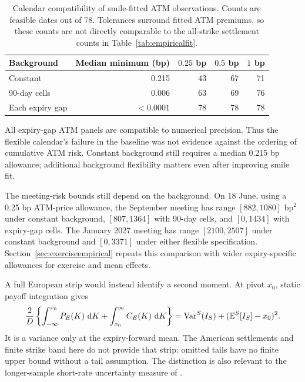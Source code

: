 \begin{table}[ht]
\centering\small
\begin{tabular}{lrrrr}
\toprule
Background & Median minimum (bp)& $0.25$ bp & $0.5$ bp & $1$ bp\\
\midrule
Constant &0.215&43&67&71\\
90-day cells &0.006&63&69&76\\
Each expiry gap &$<0.0001$&78&78&78\\
\bottomrule
\end{tabular}
\caption{Calendar compatibility of smile-fitted ATM observations. Counts are feasible dates out of 78. Tolerances surround fitted ATM premiums, so these counts are not directly comparable to the all-strike settlement counts in Table~\ref{tab:empiricalfit}.}\label{tab:smilefit}
\end{table}

All expiry-gap ATM panels are compatible to numerical precision. Thus the flexible calendar's failure in the baseline was not evidence against the ordering of cumulative ATM risk. Constant background still requires a median 0.215 bp allowance; additional background flexibility matters even after improving smile fit.

The meeting-risk bounds still depend on the background. On 18 June, using a 0.25 bp ATM-price allowance, the September meeting has range $[882,1080]$ bp$^2$ under constant background, $[807,1364]$ with 90-day cells, and $[0,1434]$ with expiry-gap cells. The January 2027 meeting has range $[2100,2507]$ under constant background and $[0,3371]$ under either flexible specification. Section~\ref{sec:exerciseempirical} repeats this comparison with wider expiry-specific allowances for exercise and mean effects.



A full European strip would instead identify a second moment. At pivot $x_0$, static payoff integration gives
\[
\frac2D\left\{\int_{-\infty}^{x_0}P_E(K)\,\,\mathrm d K+
\int_{x_0}^{\infty}C_E(K)\,\,\mathrm d K\right\}
=\operatorname{Var}^S(I_S)+(\mathbb E^S[I_S]-x_0)^2.
\]
It is a variance only at the expiry-forward mean. The American settlements and finite strike band here do not provide that strip: omitted tails have no finite upper bound without a tail assumption. The distinction is also relevant to the longer-sample short-rate uncertainty measure of \citet{bauer2021market}.

